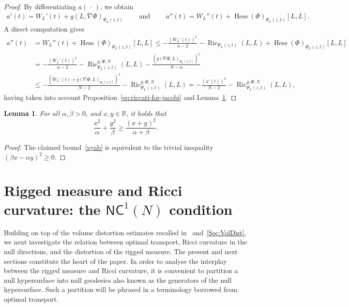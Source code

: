 \documentclass[12pt,a4paper]{amsart}
\theoremstyle{plain}
\newtheorem{lemma}{Lemma}[section]
\theoremstyle{definition}
\numberwithin{equation}{section}
\newcommand{\R}{\mathbb{R}}
\DeclareMathOperator{\Hess}{Hess}
\DeclareMathOperator{\Ric}{Ric}
\newcommand{\NC}{\mathsf{NC}}
\newcommand{\dotargument}{\,\cdot\,}
\newcommand{\gflow}{\Psi}
\begin{document}
\begin{proof}
  By differentiating $a(\dotargument)$, we obtain
  \begin{align}
    a'(t)
    =
    W_{L}'(t)
    +
    g(L,\nabla \Phi)_{\gflow_L(z,t)}
    \qquad
    \text{ and }
    \qquad
    a''(t)
    =
    W_{L}''(t)
    +
    \Hess(\Phi)_{\gflow_L(z,t)}[L,L]
    .
  \end{align}
  A direct computation gives
  \begin{align*}
    a''(t)
    &
      =
    W_{L}''(t)
    +
      \Hess(\Phi)_{\gflow_L(z,t)}[L,L]
      \leq
     - \frac{(W_{L}'(t))^2}{n-2}
      -
      \Ric_{\gflow_L(z,t)}(L,L)
      +
      \Hess(\Phi)_{\gflow_L(z,t)}[L,L]
    \\
    &
      =
      -\frac{(W_{L}'(t))^2}{n-2}
      -
      \Ric^{g,\Phi,N}_{\gflow_L(z,t)}(L,L)
      -
      \frac{(g(\nabla \Phi,L)_{\gflow_L(z,t)})^2}{N-n}
    \\
    &
      \leq
      - \frac{(W_{L}'(t)
      +g(\nabla \Phi ,L)_{\gflow_L(z,t)})^2}{N-2}
      -
      \Ric^{g,\Phi,N}_{\gflow_L(z,t)}(L,L)
      =
     - \frac{(a'(t))^2}{N-2}
      -
      \Ric^{g,\Phi,N}_{\gflow_L(z,t)}(L,L)
      ,
  \end{align*}
  having taken into account Proposition~\ref{eq:riccati-for-jacobi}
  and Lemma~\ref{lem:useful-inequality}.
\end{proof}
\begin{lemma}
  \label{lem:useful-inequality}
 For all $\alpha, \beta>0$, and $x,y\in \R$,  it holds that
  \begin{equation}\label{xyab}
    \frac{x^2}{\alpha}
    +
    \frac{y^2}{\beta}
    \geq
    \frac{(x+y)^2}{\alpha+\beta}.
  \end{equation}
\end{lemma}
\begin{proof}
The claimed bound~\eqref{xyab} is equivalent to the trivial inequality $(\beta x- \alpha y)^2\geq 0$.
\end{proof}






\section{Rigged measure and Ricci curvature: the \texorpdfstring{$\NC^1(N)$}{NC1(N)} condition}\label{sec:CD1}

Building on top of the volume distortion estimates
recalled in~ and~\ref{Sec:VolDist}, we next
investigate the relation between optimal transport, Ricci curvature
in the null directions, and the distortion of the rigged measure.
%
The present and next sections constitute the heart of the paper. In order to analyse the interplay between the rigged measure and Ricci curvature, it is convenient to partition a null
hypersurface into null geodesics also known as the generators of the null hypersurface.
Such a partition will be phrased in a terminology borrowed from optimal transport.
\end{document}
